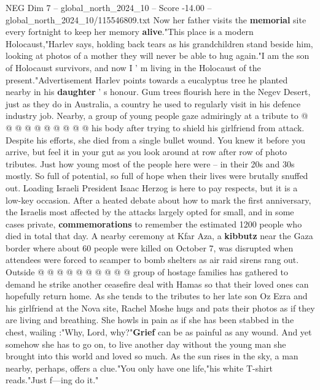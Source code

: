 \begin{textsample}{NEG Dim 7 – global\_north\_2024\_10 – Score -14.00 – global\_north\_2024\_10/115546809.txt}
Now her father visits the \textbf{memorial} site every fortnight to keep her memory \textbf{alive}."This place is a modern Holocaust,"Harlev says, holding back tears as his grandchildren stand beside him, looking at photos of a mother they will never be able to hug again."I am the son of Holocaust survivors, and now I ' m living in the Holocaust of the present."Advertisement Harlev points towards a eucalyptus tree he planted nearby in his \textbf{daughter} ' s honour.
Gum trees flourish here in the Negev Desert, just as they do in Australia, a country he used to regularly visit in his defence industry job.
Nearby, a group of young people gaze admiringly at a tribute to @ @ @ @ @ @ @ @ @ @ his body after trying to shield his girlfriend from attack.
Despite his efforts, she died from a single bullet wound.
You knew it before you arrive, but feel it in your gut as you look around at row after row of photo tributes.
Just how young most of the people here were -- in their 20s and 30s mostly.
So full of potential, so full of hope when their lives were brutally snuffed out.
Loading Israeli President Isaac Herzog is here to pay respects, but it is a low-key occasion.
After a heated debate about how to mark the first anniversary, the Israelis most affected by the attacks largely opted for small, and in some cases private, \textbf{commemorations} to remember the estimated 1200 people who died in total that day.
A nearby ceremony at Kfar Aza, a \textbf{kibbutz} near the Gaza border where about 60 people were killed on October 7, was disrupted when attendees were forced to scamper to bomb shelters as air raid sirens rang out.
Outside @ @ @ @ @ @ @ @ @ @ group of hostage families has gathered to demand he strike another ceasefire deal with Hamas so that their loved ones can hopefully return home.
As she tends to the tributes to her late son Oz Ezra and his girlfriend at the Nova site, Rachel Moshe hugs and pats their photos as if they are living and breathing.
She howls in pain as if she has been stabbed in the chest, wailing :"Why, Lord, why?"\textbf{Grief} can be as painful as any wound.
And yet somehow she has to go on, to live another day without the young man she brought into this world and loved so much.
As the sun rises in the sky, a man nearby, perhaps, offers a clue."You only have one life,"his white T-shirt reads."Just f---ing do it."

\end{textsample}
